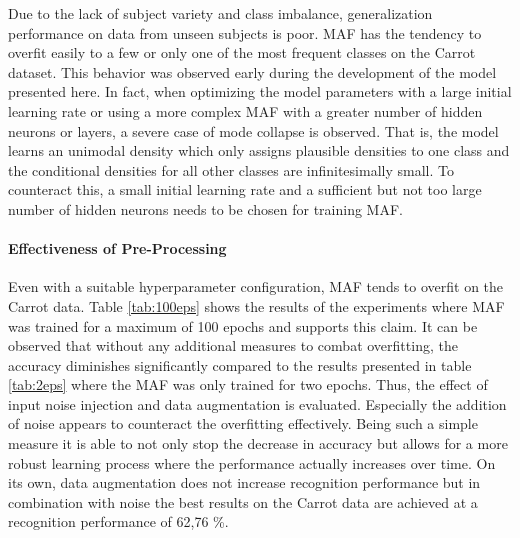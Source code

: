 \documentclass[11pt,titlepage,oneside,openany]{book}
\begin{document}
Due to the lack of subject variety and class imbalance, generalization performance on data from unseen subjects is poor. MAF has the tendency to overfit easily to a few or only one of the most frequent classes on the Carrot dataset. This behavior was observed early during the development of the model presented here. In fact, when optimizing the model parameters with a large initial learning rate or using a more complex MAF with a greater number of hidden neurons or layers, a severe case of mode collapse is observed. That is, the model learns an unimodal density which only assigns plausible densities to one class and the conditional densities for all other classes are infinitesimally small. To counteract this, a small initial learning rate and a sufficient but not too large number of hidden neurons needs to be chosen for training MAF.

\paragraph{Effectiveness of Pre-Processing}
Even with a suitable hyperparameter configuration, MAF tends to overfit on the Carrot data. Table \ref{tab:100eps} shows the results of the experiments where MAF was trained for a maximum of 100 epochs and supports this claim. It can be observed that without any additional measures to combat overfitting, the accuracy diminishes significantly compared to the results presented in table \ref{tab:2eps} where the MAF was only trained for two epochs. Thus, the effect of input noise injection and data augmentation is evaluated. Especially the addition of noise appears to counteract the overfitting effectively. Being such a simple measure it is able to not only stop the decrease in accuracy but allows for a more robust learning process where the performance actually increases over time. On its own, data augmentation does not increase recognition performance but in combination with noise the best results on the Carrot data are achieved at a recognition performance of 62,76 \%.
\end{document}
